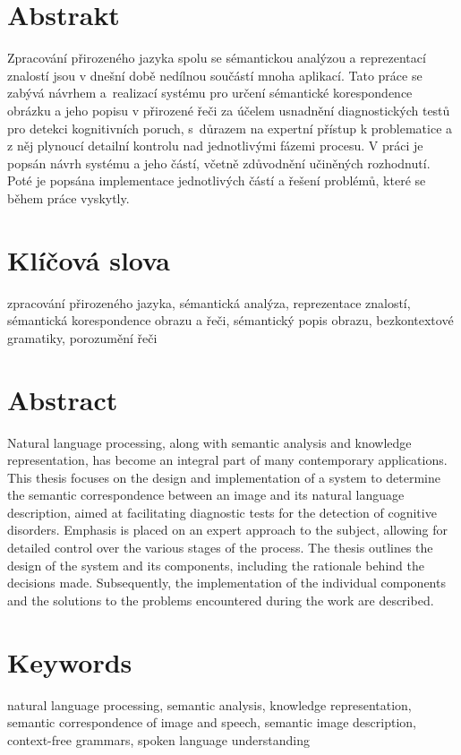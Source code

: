 \section*{Abstrakt}
Zpracování přirozeného jazyka spolu se sémantickou analýzou a reprezentací znalostí jsou v dnešní době nedílnou součástí mnoha aplikací.
Tato práce se zabývá návrhem a~realizací systému pro určení sémantické korespondence obrázku a jeho popisu v přirozené řeči
za účelem usnadnění diagnostických testů pro detekci kognitivních poruch, s~důrazem na expertní přístup k problematice a z něj
plynoucí detailní kontrolu nad jednotlivými fázemi procesu.
V práci je popsán návrh systému a jeho částí, včetně zdůvodnění učiněných rozhodnutí.
Poté je popsána implementace jednotlivých částí a řešení problémů, které se během práce vyskytly.

\section*{Klíčová slova}
zpracování přirozeného jazyka, sémantická analýza, reprezentace znalostí, sémantická korespondence obrazu a řeči, sémantický popis obrazu,
bezkontextové gramatiky, porozumění řeči

\thispagestyle{empty}
\newpage

\section*{Abstract}
Natural language processing, along with semantic analysis and knowledge representation, has become an integral part of many contemporary applications.
This thesis focuses on the design and implementation of a system to determine the semantic correspondence between an image and its natural language description,
aimed at facilitating diagnostic tests for the detection of cognitive disorders.
Emphasis is placed on an expert approach to the subject, allowing for detailed control over the various stages of the process.
The thesis outlines the design of the system and its components,
including the rationale behind the decisions made.
Subsequently, the implementation of the individual components and the solutions to the problems encountered during the work are described.


\section*{Keywords}
natural language processing, semantic analysis, knowledge representation, semantic correspondence of image and speech, semantic image description,
context-free grammars, spoken language understanding
\thispagestyle{empty}
